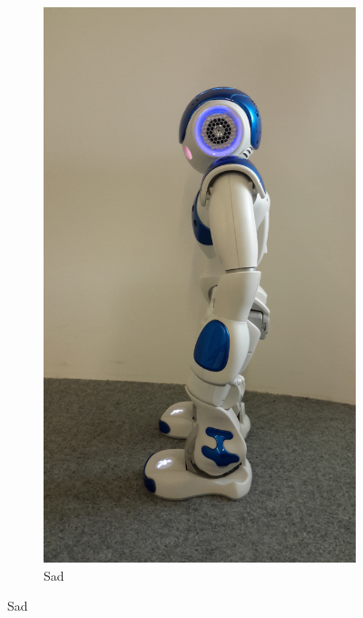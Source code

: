 \documentclass[a4paper, 10pt, conference]{ieeeconf}      %
\begin{document}
\begin{figure}
\begin{subfigure}[b]{0.18\textwidth}
        \end{subfigure}%
        ~ %
        \begin{subfigure}[b]{0.18\textwidth}
                \includegraphics[width=\textwidth]{../dissertation/figures/sad.jpg}
                \caption{Sad}
                \label{fig:sad}
        \end{subfigure}

\end{figure}
\end{document}
